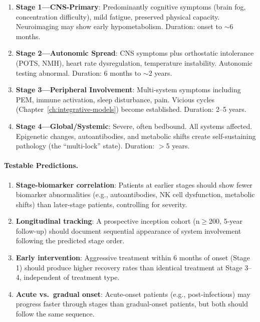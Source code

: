 \begin{hypothesis}
\begin{enumerate}
    \item \textbf{Stage 1---CNS-Primary}: Predominantly cognitive symptoms (brain fog, concentration difficulty), mild fatigue, preserved physical capacity. Neuroimaging may show early hypometabolism. Duration: onset to $\sim$6 months.

    \item \textbf{Stage 2---Autonomic Spread}: CNS symptoms plus orthostatic intolerance (POTS, NMH), heart rate dysregulation, temperature instability. Autonomic testing abnormal. Duration: 6 months to $\sim$2 years.

    \item \textbf{Stage 3---Peripheral Involvement}: Multi-system symptoms including PEM, immune activation, sleep disturbance, pain. Vicious cycles (Chapter~\ref{ch:integrative-models}) become established. Duration: 2--5 years.

    \item \textbf{Stage 4---Global/Systemic}: Severe, often bedbound. All systems affected. Epigenetic changes, autoantibodies, and metabolic shifts create self-sustaining pathology (the ``multi-lock'' state). Duration: $>$5 years.
\end{enumerate}

\paragraph{Testable Predictions.}
\begin{enumerate}
    \item \textbf{Stage-biomarker correlation}: Patients at earlier stages should show fewer biomarker abnormalities (e.g., autoantibodies, NK cell dysfunction, metabolic shifts) than later-stage patients, controlling for severity.
    \item \textbf{Longitudinal tracking}: A prospective inception cohort (n$\geq$200, 5-year follow-up) should document sequential appearance of system involvement following the predicted stage order.
    \item \textbf{Early intervention}: Aggressive treatment within 6 months of onset (Stage 1) should produce higher recovery rates than identical treatment at Stage 3--4, independent of treatment type.
    \item \textbf{Acute vs.\ gradual onset}: Acute-onset patients (e.g., post-infectious) may progress faster through stages than gradual-onset patients, but both should follow the same sequence.
\end{enumerate}


\end{hypothesis}
